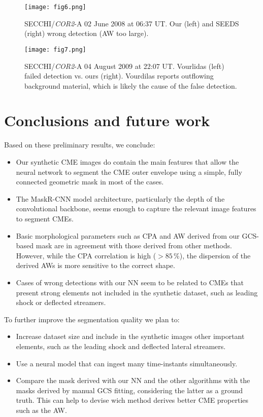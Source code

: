 \documentclass[baaa]{baaa}
\begin{document}
\begin{figure}
  \centering
  \texttt{[image: fig6.png]}
  \caption{ SECCHI/\textit{COR2}-A  02 June 2008 at 06:37 UT. Our (left) and SEEDS (right) wrong detection (AW too large). }
  \label{fig:figure6}
\end{figure}

\begin{figure}
  \centering
  \texttt{[image: fig7.png]}
  \caption{ SECCHI/\textit{COR2}-A 04 August 2009 at 22:07 UT. Vourlidas (left) failed detection vs. ours (right). Vourdilas reports outflowing background material, which is likely the cause of the false detection.  }
  \label{fig:figure7}
\end{figure}

\section{Conclusions and future work}
Based on these preliminary results, we conclude:
\begin{itemize}
\item Our synthetic CME images do contain the main features that allow the neural network to segment the CME outer envelope using a simple, fully connected geometric mask in most of the cases. 
\item The MaskR-CNN model architecture, particularly the depth of the convolutional backbone, seems enough to capture the relevant image features to segment CMEs.
\item Basic morphological parameters such as CPA and AW derived from our GCS-based mask are in agreement with those derived from other methods. However, while the CPA correlation is high ($>85\,\%$), the dispersion of the derived AWs is more sensitive to the correct shape. 
\item Cases of wrong detections with our NN seem to be related to CMEs that present strong elements not included in the synthetic dataset, such as leading shock or deflected streamers. 
\end{itemize}
To further improve the segmentation quality we plan to:
\begin{itemize}
\item Increase dataset size and include in the synthetic images other important elements, such as the leading shock and deflected lateral streamers. 
\item Use a neural model that can ingest many time-instants simultaneously.
\item Compare the mask derived with our NN and the other algorithms with the masks derived by manual GCS fitting, considering the latter as a ground truth. This can help to devise wich method derives better CME properties such as the AW.
\end{itemize}
\end{document}
